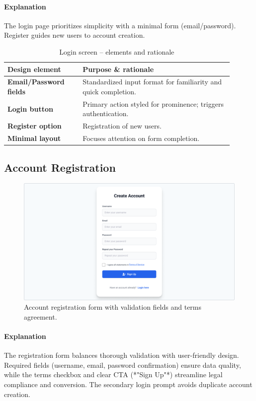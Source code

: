 \documentclass[12pt]{article}
\begin{document}
	\paragraph{Explanation}%
	The login page prioritizes simplicity with a minimal form (email/password).
	Register guides new users to account creation. 
	\begin{table}[H]
		\centering
		\caption{Login screen – elements and rationale}
		\label{tab:login-elements}
		\begin{tabular}{p{0.30\linewidth} p{0.60\linewidth}}
			\toprule
			\textbf{Design element} & \textbf{Purpose \& rationale} \\ \midrule
			\textbf{Email/Password fields}  & Standardized input format for familiarity and quick completion. \\
			\textbf{Login button}       	& Primary action styled for prominence; triggers authentication. \\
			\textbf{Register option}        & Registration of new users. \\
			\textbf{Minimal layout}         & Focuses attention on form completion. \\
			\bottomrule
		\end{tabular}
	\end{table}

	\subsection{Account Registration}\label{subsec:account-registration}

	\begin{figure}[H]
		\centering
		\includegraphics[width=0.6\linewidth]{pictures/main/RegisterAccount_Figma}%
		\caption{Account registration form with validation fields and terms agreement.}
		\label{fig:ui-register}
	\end{figure}

	\paragraph{Explanation}%
	The registration form balances thorough validation with user-friendly design.
	Required fields (username, email, password confirmation) ensure data quality, while the terms checkbox and clear CTA (*"Sign Up"*) streamline legal compliance and conversion.
	The secondary login prompt avoids duplicate account creation.
\end{document}
